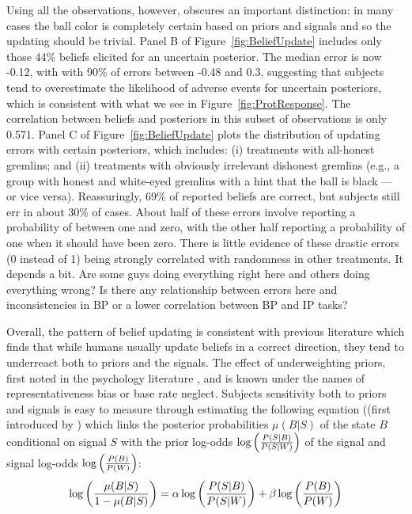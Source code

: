 \documentclass[12pt,a4paper]{article}
\newcommand{\aut}[1]{{\color{Red}#1}}
\newcommand{\pmt}[1]{{\color{Blue}#1}}
\begin{document}
Using all the observations, however, obscures an important distinction: in many cases the ball color is completely certain based on priors and signals and so the updating should be trivial.  Panel B of Figure~\ref{fig:BeliefUpdate} includes only those 44\% beliefs elicited for an uncertain posterior. The median error is now -0.12, with with 90\% of errors between -0.48 and 0.3, suggesting that subjects tend to overestimate the likelihood of adverse events for uncertain posteriors, \pmt{which is consistent with what we see in Figure~\ref{fig:ProtResponse}}. The correlation between beliefs and posteriors in this subset of observations is only 0.571.  Panel C of Figure~\ref{fig:BeliefUpdate} plots the distribution of updating errors with certain posteriors, which includes: (i) treatments with all-honest gremlins; and (ii) treatments with obviously irrelevant dishonest gremlins (e.g., a group with honest and white-eyed gremlins with a hint that the ball is black — or vice versa). Reassuringly, 69\% of reported beliefs are correct, but subjects still err in about 30\% of cases. About half of these errors involve reporting a probability of between one and zero, with the other half reporting a probability of one when it should have been zero. \aut{There is little evidence of these drastic errors (0 instead of 1) being strongly correlated with randomness in other treatments.} \pmt{It depends a bit.  Are some guys doing everything right here and others doing everything wrong?  Is there any relationship between errors here and inconsistencies in BP or a lower correlation between BP and IP tasks?} 

Overall, the pattern of belief updating is consistent with previous literature which finds that while humans usually update beliefs in a correct direction, they tend to underreact both to priors and the signals. The effect of underweighting priors, first noted in the psychology literature \citep*{phillips_conservatism_1966-1, tversky_belief_1971, kahneman_subjective_1972}, and is known under the names of representativeness bias or base rate neglect. Subjects sensitivity both to priors and signals is easy to measure through estimating the following equation ((first introduced by \citet{grether_bayes_1980}) which links the posterior probabilities $\mu(B|S)$ of the state $B$ conditional on signal $S$ with the prior log-odds $\log\left({P(S|B) \over P(S|W)}\right)$ of the signal and signal log-odds $\log \left({P(B)\over P(W)}\right)$: 
\begin{equation}
\log\left({\mu(B|S) \over 1-\mu(B|S)}\right)=\alpha \log\left({P(S|B) \over P(S|W)}\right)+\beta \log \left({P(B)\over P(W)}\right)
\end{equation}
\end{document}
